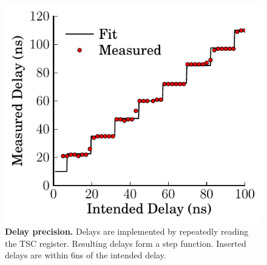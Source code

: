 \begin{figure}
  \centering
  \includegraphics[width=.50\linewidth]{OLTP_eval/Delay.pdf}
  \caption{\textbf{Delay precision.} Delays are implemented by repeatedly reading the TSC register.  Resulting delays form a step function.  Inserted delays are within 6ns of the intended delay.}
  \label{fig::Delay}
\end{figure}

